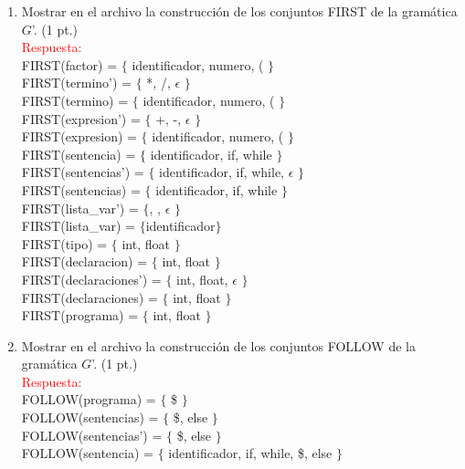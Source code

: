 \documentclass[11pt]{report}
\begin{document}
\begin{enumerate}
\begin{enumerate}[label=\alph*.]
        \texttt{termino -> factor termino'} \\
        \texttt{termino' -> * factor termino' | } $\backslash$ \texttt{factor termino' | } $\epsilon$ \\
        \texttt{factor -> identificador | numero | (expresion)} \\
        \texttt{\}}
    \end{enumerate}
  \item Mostrar en el archivo la construcción de los conjuntos FIRST de la
  gramática $G$'. (1 pt.) \\
    \textcolor{red}{Respuesta:} \\
    FIRST(factor) = $\{$ identificador, numero, ( $\}$ \\
    FIRST(termino') = $\{$ *, /, $\epsilon$ $\}$ \\
    FIRST(termino) = $\{$ identificador, numero, ( $\}$ \\
    FIRST(expresion') = $\{$ +, -, $\epsilon$ $\}$ \\
    FIRST(expresion) = $\{$ identificador, numero, ( $\}$ \\
    FIRST(sentencia) = $\{$ identificador, if, while $\}$ \\
    FIRST(sentencias') = $\{$ identificador, if, while, $\epsilon$ $\}$ \\
    FIRST(sentencias) = $\{$ identificador, if, while $\}$ \\
    FIRST(lista\_var') = $\{$, , $\epsilon$ $\}$ \\
    FIRST(lista\_var) = $\{$identificador$\}$ \\
    FIRST(tipo) = $\{$ int, float $\}$ \\
    FIRST(declaracion) = $\{$ int, float $\}$ \\
    FIRST(declaraciones') = $\{$ int, float, $\epsilon$ $\}$ \\
    FIRST(declaraciones) = $\{$ int, float $\}$ \\
    FIRST(programa) = $\{$ int, float $\}$
  \item Mostrar en el archivo la construcción de los conjuntos FOLLOW de la
  gramática $G$'. (1 pt.) \\
    \textcolor{red}{Respuesta:} \\
    FOLLOW(programa) = $\{$ \$ $\}$ \\
    FOLLOW(sentencias) = $\{$ \$, else $\}$ \\
    FOLLOW(sentencias') = $\{$ \$, else $\}$ \\
    FOLLOW(sentencia) = $\{$ identificador, if, while, \$, else $\}$ \\

\end{enumerate}
\end{document}
